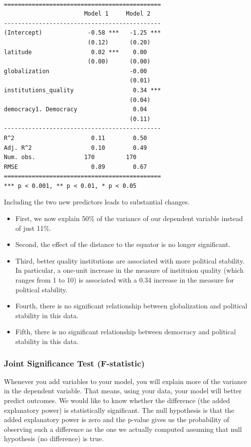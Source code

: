 \documentclass[]{article}
\providecommand{\tightlist}{%
  \setlength{\itemsep}{0pt}\setlength{\parskip}{0pt}}
\theoremstyle{definition}
\theoremstyle{definition}
\theoremstyle{definition}
\theoremstyle{remark}
\begin{document}
\begin{verbatim}

=============================================
                       Model 1     Model 2   
---------------------------------------------
(Intercept)             -0.58 ***   -1.25 ***
                        (0.12)      (0.20)   
latitude                 0.02 ***    0.00    
                        (0.00)      (0.00)   
globalization                       -0.00    
                                    (0.01)   
institutions_quality                 0.34 ***
                                    (0.04)   
democracy1. Democracy                0.04    
                                    (0.11)   
---------------------------------------------
R^2                      0.11        0.50    
Adj. R^2                 0.10        0.49    
Num. obs.              170         170       
RMSE                     0.89        0.67    
=============================================
*** p < 0.001, ** p < 0.01, * p < 0.05
\end{verbatim}

Including the two new predictors leads to substantial changes.

\begin{itemize}
\tightlist
\item
  First, we now explain 50\% of the variance of our dependent variable
  instead of just 11\%.
\item
  Second, the effect of the distance to the equator is no longer
  significant.
\item
  Third, better quality institutions are associated with more political
  stability. In particular, a one-unit increase in the measure of
  instituion quality (which ranges from 1 to 10) is associated with a
  0.34 increase in the measure for political stability.
\item
  Fourth, there is no significant relationship between globalization and
  political stability in this data.
\item
  Fifth, there is no significant relationship between democracy and
  political stability in this data.
\end{itemize}

\subsubsection{Joint Significance Test
(F-statistic)}\label{joint-significance-test-f-statistic}

Whenever you add variables to your model, you will explain more of the
variance in the dependent variable. That means, using your data, your
model will better predict outcomes. We would like to know whether the
difference (the added explanatory power) is statistically significant.
The null hypothesis is that the added explanatory power is zero and the
p-value gives us the probability of observing such a difference as the
one we actually computed assuming that null hypothesis (no difference)
is true.
\end{document}
